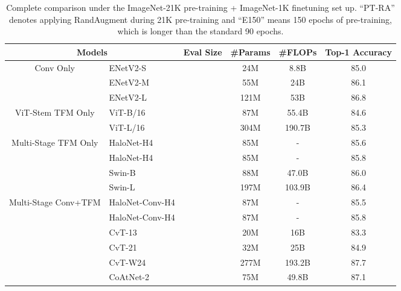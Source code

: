 \documentclass{article}
\newcommand{\name}{CoAtNet\xspace}
\begin{document}
\begin{table}[!ht]
\footnotesize
    \centering
    \caption{Complete comparison under the ImageNet-21K pre-training + ImageNet-1K finetuning set up. ``PT-RA'' denotes applying RandAugment during 21K pre-training and ``E150'' means 150 epochs of pre-training, which is longer than the standard 90 epochs.}
    \begin{tabular}{c l c c c c}
        \toprule
        \multicolumn{2}{c}{\bf Models} & \bf Eval Size & \bf \#Params & \bf \#FLOPs & \bf Top-1 Accuracy \\
        \midrule
        \multirow{3}{*}{Conv Only}
        & ENetV2-S &  & 24M  & 8.8B & 85.0 \\
        & ENetV2-M &  & 55M  & 24B  & 86.1 \\
        & ENetV2-L &  & 121M & 53B  & 86.8 \\
        \cmidrule(r){1-2} \cmidrule(lr){3-3} \cmidrule(lr){4-5} \cmidrule(l){6-6}
        \multirow{2}{*}{ViT-Stem TFM Only}
        & ViT-B/16 &  & 87M  & 55.4B  & 84.6 \\
        & ViT-L/16 &  & 304M & 190.7B & 85.3 \\
        \cmidrule(r){1-2} \cmidrule(lr){3-3} \cmidrule(lr){4-5} \cmidrule(l){6-6}
        \multirow{4}{*}{Multi-Stage TFM Only} 
        & HaloNet-H4 &  & 85M & - & 85.6 \\
        & HaloNet-H4 &  & 85M & - & 85.8 \\
        \cmidrule(r){2-2} \cmidrule(lr){3-3} \cmidrule(lr){4-5} \cmidrule(l){6-6}
        & Swin-B  &  & 88M  & 47.0B  & 86.0 \\
        & Swin-L  &  & 197M & 103.9B & 86.4 \\
        \cmidrule(r){1-2} \cmidrule(lr){3-3} \cmidrule(lr){4-5} \cmidrule(l){6-6}
        \multirow{3}{*}{Multi-Stage Conv+TFM}
        & HaloNet-Conv-H4 &  & 87M & - & 85.5 \\
        & HaloNet-Conv-H4 &  & 87M & - & 85.8 \\
        \cmidrule(r){1-2} \cmidrule(lr){3-3} \cmidrule(lr){4-5} \cmidrule(l){6-6}
        & CvT-13  &  & 20M  & 16B    & 83.3 \\
        & CvT-21  &  & 32M  & 25B    & 84.9 \\
        & CvT-W24 &  & 277M & 193.2B & 87.7 \\
        \cmidrule(r){1-2} \cmidrule(lr){3-3} \cmidrule(lr){4-5} \cmidrule(l){6-6}
        \multirow{8}{*}{\makecell{Proposed \\ Multi-Stage Conv+TFM}}
        & \name-2 &  & 75M  & 49.8B & 87.1 \\

\end{tabular}
\end{table}
\end{document}
